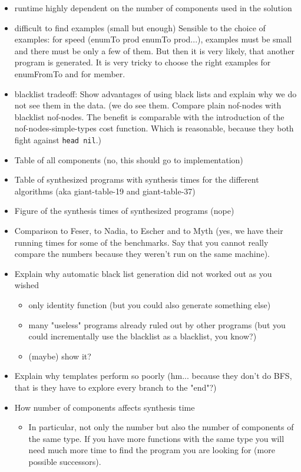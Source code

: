 \begin{itemize}
\item runtime highly dependent on the number of components used in the solution 
\item difficult to find examples (small but enough)
Sensible to the choice of examples: for speed (enumTo prod enumTo prod...), examples must be small and there must be only a few of them. But then it is very likely, that another program is generated. It is very tricky to choose the right examples for enumFromTo and for member.
\item blacklist tradeoff: Show advantages of using black lists and explain why we do not see them in the data. (we do see them. Compare plain nof-nodes with blacklist nof-nodes. The benefit is comparable with the introduction of the nof-nodes-simple-types cost function. Which is reasonable, because they both fight against \lstinline?head nil?.)
\item Table of all components (no, this should go to implementation)
\item Table of synthesized programs with synthesis times for the different algorithms (aka giant-table-19 and giant-table-37)
\item Figure of the synthesis times of synthesized programs (nope)
\item Comparison to Feser, to Nadia, to Escher and to Myth (yes, we have their running times for some of the benchmarks. Say that you cannot really compare the numbers because they weren't run on the same machine).
\item Explain why automatic black list generation did not worked out as you wished
\begin{itemize}
\item only identity function (but you could also generate something else)
\item many "useless" programs already ruled out by other programs (but you could incrementally use the blacklist as a blacklist, you know?)
\item (maybe) show it?
\end{itemize}
\item Explain why templates perform so poorly (hm... because they don't do BFS, that is they have to explore every branch to the "end"?)
\item How number of components affects synthesis time
\begin{itemize}
\item In particular, not only the number but also the number of components of the same type. If you have more functions with the same type you will need much more time to find the program you are looking for (more possible successors).

\end{itemize}
\end{itemize}
